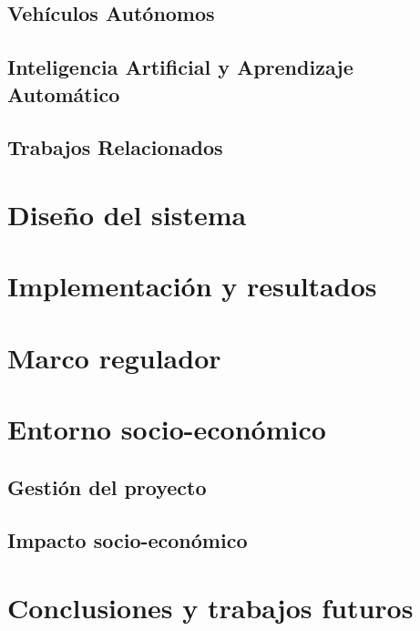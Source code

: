 \documentclass[12pt]{report} %
\begin{document}
\section{Vehículos Autónomos}



\section{Inteligencia Artificial y Aprendizaje Automático}



\section{Trabajos Relacionados}



\chapter{Diseño del sistema}



\chapter{Implementación y resultados}



\chapter{Marco regulador}



\chapter{Entorno socio-económico}

\section{Gestión del proyecto}



\section{Impacto socio-económico}



\chapter{Conclusiones y trabajos futuros}
\end{document}
